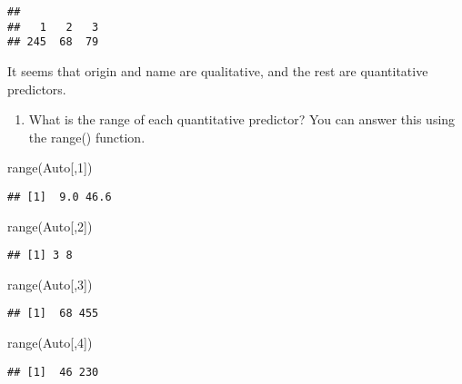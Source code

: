\documentclass[
]{article}
\newenvironment{Shaded}{\begin{snugshade}}{\end{snugshade}}
\newcommand{\DecValTok}[1]{\textcolor[rgb]{0.00,0.00,0.81}{#1}}
\newcommand{\FunctionTok}[1]{\textcolor[rgb]{0.00,0.00,0.00}{#1}}
\newcommand{\NormalTok}[1]{#1}
\providecommand{\tightlist}{%
  \setlength{\itemsep}{0pt}\setlength{\parskip}{0pt}}
\begin{document}
\begin{verbatim}
## 
##   1   2   3 
## 245  68  79
\end{verbatim}

It seems that origin and name are qualitative, and the rest are
quantitative predictors.

\begin{enumerate}
\def\labelenumi{(\alph{enumi})}
\setcounter{enumi}{1}
\tightlist
\item
  What is the range of each quantitative predictor? You can answer this
  using the range() function.
\end{enumerate}

\begin{Shaded}
\begin{Highlighting}[]
\FunctionTok{range}\NormalTok{(Auto[,}\DecValTok{1}\NormalTok{])}
\end{Highlighting}
\end{Shaded}

\begin{verbatim}
## [1]  9.0 46.6
\end{verbatim}

\begin{Shaded}
\begin{Highlighting}[]
\FunctionTok{range}\NormalTok{(Auto[,}\DecValTok{2}\NormalTok{])}
\end{Highlighting}
\end{Shaded}

\begin{verbatim}
## [1] 3 8
\end{verbatim}

\begin{Shaded}
\begin{Highlighting}[]
\FunctionTok{range}\NormalTok{(Auto[,}\DecValTok{3}\NormalTok{])}
\end{Highlighting}
\end{Shaded}

\begin{verbatim}
## [1]  68 455
\end{verbatim}

\begin{Shaded}
\begin{Highlighting}[]
\FunctionTok{range}\NormalTok{(Auto[,}\DecValTok{4}\NormalTok{])}
\end{Highlighting}
\end{Shaded}

\begin{verbatim}
## [1]  46 230
\end{verbatim}
\end{document}
